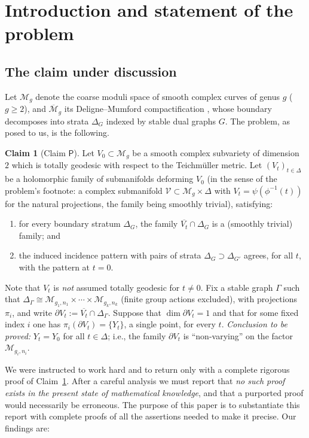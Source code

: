 \documentclass[11pt]{amsart}
\newcommand{\M}{\mathcal{M}}
\theoremstyle{plain}
\theoremstyle{definition}
\newtheorem{claim}[theorem]{Claim}
\theoremstyle{remark}
\begin{document}
\section{Introduction and statement of the problem}\label{sec:intro}

\subsection*{The claim under discussion}

Let $\M_g$ denote the coarse moduli space of smooth complex curves of genus $g$
($g\ge 2$), and $\overline{\M}_g$ its Deligne--Mumford compactification
\cite{DM}, whose boundary decomposes into strata $\Delta_G$ indexed by stable dual
graphs $G$. The problem, as posed to us, is the following.

\begin{claim}[Claim $\mathsf{P}$]\label{claim:P}
Let $V_0\subset\M_g$ be a smooth complex subvariety of dimension $2$ which is totally
geodesic with respect to the Teichm\"uller metric. Let $(V_t)_{t\in\Delta}$ be a
holomorphic family of submanifolds deforming $V_0$ (in the sense of the problem's
footnote: a complex submanifold $\mathcal V\subset \M_g\times\Delta$ with
$V_t=\psi(\phi^{-1}(t))$ for the natural projections, the family being smoothly
trivial), satisfying:
\begin{enumerate}
\item[(i)] for every boundary stratum $\Delta_G$, the family
$\overline{V_t}\cap \Delta_G$ is a (smoothly trivial) family; and
\item[(ii)] the induced incidence pattern with pairs of strata
$\Delta_G \supset \Delta_{G'}$ agrees, for all $t$, with the pattern at $t=0$.
\end{enumerate}
Note that $V_t$ is \emph{not} assumed totally geodesic for $t\neq 0$.
Fix a stable graph $\Gamma$ such that
$\Delta_\Gamma\cong \M_{g_1,n_1}\times\cdots\times \M_{g_k,n_k}$ (finite group actions
excluded), with projections $\pi_i$, and write $\partial V_t:=\overline{V_t}\cap
\Delta_\Gamma$. Suppose that $\dim \partial V_t=1$ and that for some fixed index $i$
one has $\pi_i(\partial V_t)=\{Y_t\}$, a single point, for every $t$.
\emph{Conclusion to be proved:} $Y_t=Y_0$ for all $t\in\Delta$; i.e., the family
$\partial V_t$ is ``non-varying'' on the factor $\M_{g_i,n_i}$.
\end{claim}

We were instructed to work hard and to return only with a complete rigorous proof of
Claim~\ref{claim:P}. After a careful analysis we must report that \emph{no such proof
exists in the present state of mathematical knowledge}, and that a purported proof
would necessarily be erroneous. The purpose of this paper is to substantiate this
report with complete proofs of all the assertions needed to make it precise. Our
findings are:
\end{document}

